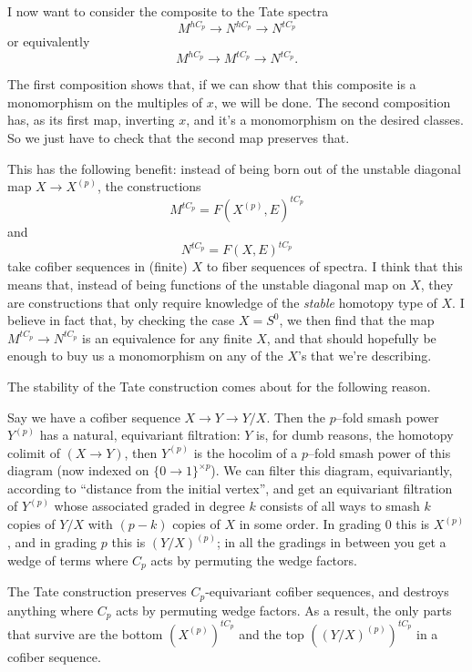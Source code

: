 I now want to consider the composite to the Tate spectra \[M^{hC_p} \to N^{hC_p} \to N^{tC_p}\] or equivalently \[M^{hC_p} \to M^{tC_p} \to N^{tC_p}.\]

The first composition shows that, if we can show that this composite is a monomorphism on the multiples of $x$, we will be done. The second composition has, as its first map, inverting $x$, and it's a monomorphism on the desired classes. So we just have to check that the second map preserves that.

This has the following benefit: instead of being born out of the unstable diagonal map $X \to X^{(p)}$, the constructions
\[M^{tC_p} = F(X^{(p)}, E)^{tC_p}\]
and
\[N^{tC_p} = F(X,E)^{tC_p}\]
take cofiber sequences in (finite) $X$ to fiber sequences of spectra. I think that this means that, instead of being functions of the unstable diagonal map on $X$, they are constructions that only require knowledge of the \emph{stable} homotopy type of $X$. I believe in fact that, by checking the case $X = S^0$, we then find that the map $M^{tC_p} \to N^{tC_p}$ is an equivalence for any finite $X$, and that should hopefully be enough to buy us a monomorphism on any of the $X$'s that we're describing.



The stability of the Tate construction comes about for the following reason.

Say we have a cofiber sequence $X \to Y \to Y/X$. Then the $p$--fold smash power $Y^{(p)}$ has a natural, equivariant filtration: $Y$ is, for dumb reasons, the homotopy colimit of $(X \to Y)$, then $Y^{(p)}$ is the hocolim of a $p$--fold smash power of this diagram (now indexed on $\{0 \to 1\}^{\times p}$). We can filter this diagram, equivariantly, according to ``distance from the initial vertex'', and get an equivariant filtration of $Y^{(p)}$ whose associated graded in degree $k$ consists of all ways to smash $k$ copies of $Y/X$ with $(p-k)$ copies of $X$ in some order. In grading $0$ this is $X^{(p)}$, and in grading $p$ this is $(Y/X)^{(p)}$; in all the gradings in between you get a wedge of terms where $C_p$ acts by permuting the wedge factors.

The Tate construction preserves $C_p$-equivariant cofiber sequences, and destroys anything where $C_p$ acts by permuting wedge factors. As a result, the only parts that survive are the bottom $(X^{(p)})^{tC_p}$ and the top $((Y/X)^{(p)})^{tC_p}$ in a cofiber sequence.

